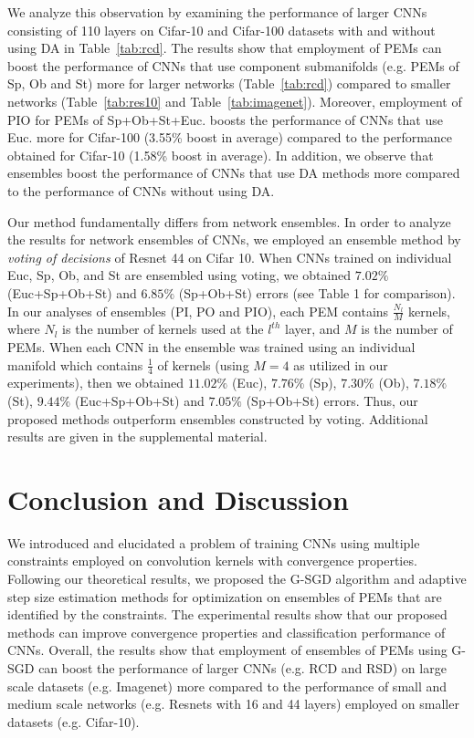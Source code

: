\documentclass[10pt,journal,compsoc]{IEEEtran}
\theoremstyle{definition}
\theoremstyle{definition}
\theoremstyle{remark}
\theoremstyle{remark}
\theoremstyle{remark}
\begin{document}
We analyze this observation by examining the performance of larger CNNs consisting of 110 layers on Cifar-10 and Cifar-100 datasets with and without using DA in Table~\ref{tab:rcd}. The results show that employment of PEMs can boost the performance of CNNs that use component submanifolds (e.g. PEMs of Sp, Ob and St) more for larger networks (Table~\ref{tab:rcd}) compared to smaller networks (Table~\ref{tab:res10} and Table~\ref{tab:imagenet}).  Moreover, employment of PIO for PEMs of Sp+Ob+St+Euc. boosts the performance of CNNs that use {\color{red}Euc.} more for Cifar-100 (3.55\% boost in average) compared to the performance obtained for Cifar-10 (1.58\% boost in average). In addition, we observe that ensembles boost the performance of CNNs that use DA methods more compared to the performance of CNNs without using DA. %

Our method fundamentally differs from network ensembles. In order to analyze the results for network ensembles of CNNs, we employed an ensemble method \cite{res_net} by \textit{voting of decisions} of Resnet 44 on Cifar 10. When CNNs trained on individual Euc, Sp, Ob, and St are ensembled using voting, we obtained $7.02\%$  (Euc+Sp+Ob+St) and $6.85\%$ (Sp+Ob+St) errors (see Table 1 for comparison). In our analyses of ensembles (PI, PO and PIO), each PEM contains $\frac{N_l}{M}$ kernels, where $N_l$ is the number of kernels used at the $l^{th}$ layer, and $M$ is the number of PEMs. When each CNN in the ensemble was trained using an individual manifold which contains $\frac{1}{4}$ of kernels (using $M=4$ as utilized in our experiments), then we obtained $11.02\%$ (Euc), $7.76\%$ (Sp), $7.30\%$ (Ob), $7.18\%$ (St), $9.44\%$ (Euc+Sp+Ob+St) and $7.05\%$ (Sp+Ob+St) errors. Thus, our proposed methods outperform ensembles constructed by voting. Additional results are given in the supplemental material.

\section{Conclusion and Discussion}
\label{sec:conc}

We introduced and elucidated a problem of training CNNs using multiple constraints  employed on  convolution kernels with convergence properties. Following our theoretical results, we proposed the G-SGD algorithm and adaptive step size estimation methods for optimization on ensembles of PEMs that are identified by the constraints. The experimental results show that our proposed  methods can improve   convergence properties and classification performance of CNNs. Overall, the results show that employment of ensembles of PEMs using G-SGD can boost the performance of larger CNNs (e.g. RCD and RSD) on large scale datasets (e.g. Imagenet) more compared to the performance of small and medium scale networks (e.g. Resnets with 16 and 44 layers) employed on smaller datasets (e.g. Cifar-10). 
\end{document}
